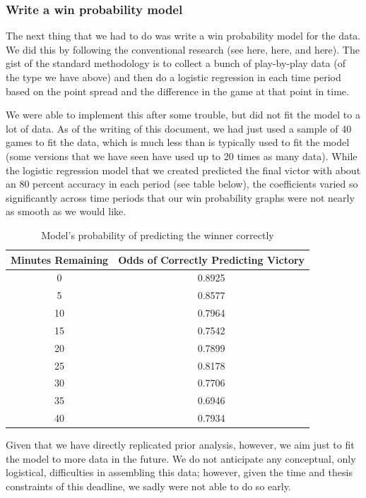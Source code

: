 \documentclass[12pt]{article}
\begin{document}
\subsubsection*{Write a win probability model}

The next thing that we had to do was write a win probability model for the data. We did this by following the conventional research (see here, here, and here). The gist of the standard methodology is to collect a bunch of play-by-play data (of the type we have above) and then do a logistic regression in each time period based on the point spread and the difference in the game at that point in time.

We were able to implement this after some trouble, but did not fit the model to a lot of data. As of the writing of this document, we had just used a sample of 40 games to fit the data, which is much less than is typically used to fit the model (some versions that we have seen have used up to 20 times as many data). While the logistic regression model that we created predicted the final victor with about an 80 percent accuracy in each period (see table below), the coefficients varied so significantly across time periods that our win probability graphs were not nearly as smooth as we would like. 

\begin{table}[H] 
\centering  
\caption{Model's probability of predicting the winner correctly}   
\begin{tabular}{c c}
\hline \hline
Minutes Remaining & Odds of Correctly Predicting Victory \\ [0.5ex]
\hline
0 & 0.8925 \\
5 & 0.8577 \\
10 & 0.7964 \\
15 & 0.7542 \\
20 & 0.7899 \\ 
25 & 0.8178 \\ 
30 & 0.7706 \\ 
35 & 0.6946 \\ 
40 & 0.7934 \\
\hline
\end{tabular}
\end{table}

Given that we have directly replicated prior analysis, however, we aim just to fit the model to more data in the future. We do not anticipate any conceptual, only logistical, difficulties in assembling this data; however, given the time and thesis constraints of this deadline, we sadly were not able to do so early. 
\end{document}
